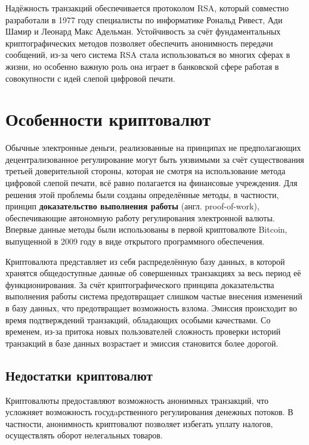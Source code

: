 \documentclass[12pt,a4paper]{article}
\begin{document}
Надёжность транзакций обеспечивается протоколом RSA, который совместно разработали в 1977 году специалисты по информатике Рональд Ривест, Ади Шамир и Леонард Макс Адельман. Устойчивость за счёт фундаментальных криптографических методов позволяет обеспечить анонимность передачи сообщений, из-за чего система RSA стала использоваться во многих сферах в жизни, но особенно важную роль она играет в банковской сфере работая в совокупности с идей слепой цифровой печати.\cite[с.~47]{cite4}



\section{Особенности криптовалют}

Обычные электронные деньги, реализованные на принципах не предполагающих децентрализованное регулирование могут быть уязвимыми за счёт существования третьей доверительной стороны, которая не смотря на использование метода цифровой слепой печати, всё равно полагается на финансовые учреждения. Для решения этой проблемы были созданы определённые методы, в частности, принцип \textbf{доказательство выполнения работы} (англ. proof-of-work), обеспечивающие автономную работу регулирования электронной валюты. Впервые данные методы были использованы в первой криптовалюте Bitcoin, выпущенной в 2009 году в виде открытого программного обеспечения. 

Криптовалюта представляет из себя распределённую базу данных, в которой хранятся общедоступные данные об совершенных транзакциях за весь период её функционирования. За счёт криптографического принципа доказательства выполнения работы система предотвращает слишком частые внесения изменений в базу данных, что предотвращает возможность взлома. Эмиссия происходит во время подтверждений транзакций, обладающих особыми качествами. Со временем, из-за притока новых пользователей сложность проверки историй транзакций в базе данных возрастает и эмиссия становится более дорогой.\cite{cite5}

\subsection{Недостатки криптовалют}

Криптовалюты предоставляют возможность анонимных транзакций, что усложняет возможность госудaрственного регулирования денежных потоков. В частности, анонимность криптовалют позволяет избегать уплату налогов, осуществлять оборот нелегальных товаров.\cite{cite6} 
\end{document}
